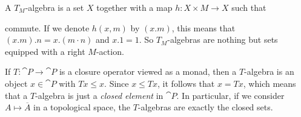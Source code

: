 \begin{example}
    A $T_M$-algebra is a set $X$ together with a map $h \colon X \times M \to X$
    such that 
    \begin{figure}[H]
        \centering
        \begin{subfigure}{0.4\textwidth}
        \centering
        \end{subfigure}
        \hspace{2em}
        \begin{subfigure}{0.4\textwidth}
        \centering
        \end{subfigure}
        \end{figure}
        commute. If we denote $h(x,m)$ by $(x . m)$, this means that
        $(x . m) . n = x . (m \cdot n)$ and $x . 1 = 1$.
        So $T_M$-algebras are nothing but sets equipped with a right $M$-action.
\end{example}
\begin{example}
    If $T \colon \cat{P} \to \cat{P}$ is a closure operator viewed as a monad, then a $T$-algebra is
    an object $x \in \cat{P}$ with $Tx \leq x$. Since $x \leq Tx$, it follows that $x = Tx$, which means that
    a $T$-algebra is just a \textit{closed element} in $\cat{P}$.
    In particular, if we consider $A \mapsto \overline{A}$ in a topological space,
    the $T$-algebras are exactly the closed sets.
\end{example}

